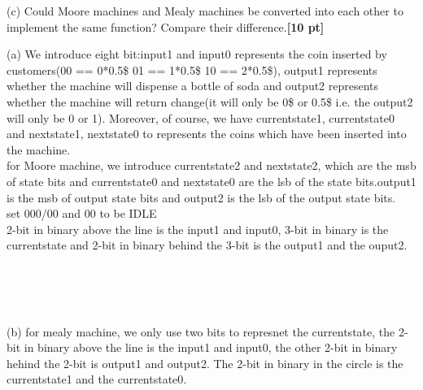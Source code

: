 \documentclass[a4paper]{article}
\begin{document}
(c) Could Moore machines and Mealy machines be converted into each other to implement the same function? Compare their difference.\textbf{[10 pt]}
\begin{answer}[Question 3]
    \item[(a)]
    We introduce eight bit:input1 and input0 represents the coin inserted by customers(00 == 0*0.5\$ 01 == 1*0.5\$ 10 == 2*0.5\$), output1 represents whether the machine will dispense a bottle of soda and output2 represents whether the machine will return change(it will only be 0\$ or 0.5\$ i.e. the output2 will only be 0 or 1). Moreover, of course, we have currentstate1, currentstate0 and nextstate1, nextstate0 to represents the coins which have been inserted into the machine.\\
    for Moore machine, we introduce currentstate2 and nextstate2, which are the msb of state bits and currentstate0 and nextstate0 are the lsb of the state bits.output1 is the msb of output state bits and output2 is the lsb of the output state bits.\\
    set 000/00 and 00 to be IDLE\\
    2-bit in binary above the line is the input1 and input0, 3-bit in binary is the currentstate and 2-bit in binary behind the 3-bit is the output1 and the ouput2.\\
    \\
    \\
    \\
    \item[(b)]
    for mealy machine, we only use two bits to represnet the currentstate, the 2-bit in binary above the line is the input1 and input0, the other 2-bit in binary hehind the 2-bit is output1 and output2. The 2-bit in binary in the circle is the currentstate1 and the currentstate0.\\
\end{answer}
\end{document}
